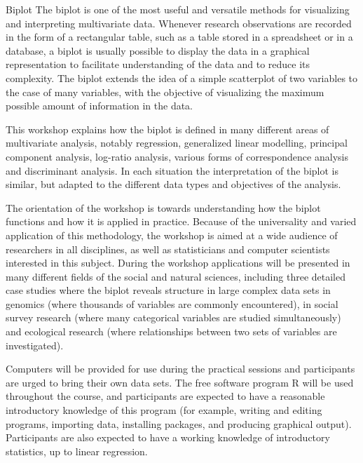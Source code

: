 Biplot
The biplot is one of the most useful and versatile methods for visualizing and interpreting multivariate data. Whenever research observations are recorded in the form of a rectangular table, such as a table stored in a spreadsheet or in a database, a biplot is usually possible to display the data in a graphical representation to facilitate understanding of the data and to reduce its complexity. The biplot extends the idea of a simple scatterplot of two variables to the case of many variables, with the objective of visualizing the maximum possible amount of information in the data.

This workshop explains how the biplot is defined in many different areas of multivariate analysis, notably regression, generalized linear modelling, principal component analysis, log-ratio analysis, various forms of correspondence analysis and discriminant analysis. In each situation the interpretation of the biplot is similar, but adapted to the different data types and objectives of the analysis.

The orientation of the workshop is towards understanding how the biplot functions and how it is applied in practice. Because of the universality and varied application of this methodology, the workshop is aimed at a wide audience of researchers in all disciplines, as well as statisticians and computer scientists interested in this subject. During the workshop applications will be presented in many different fields of the social and natural sciences, including three detailed case studies where the biplot reveals structure in large complex data sets in genomics (where thousands of variables are commonly encountered), in social survey research (where many categorical variables are studied simultaneously) and ecological research (where relationships between two sets of variables are investigated).

Computers will be provided for use during the practical sessions and participants are urged to bring their own data sets. The free software program R will be used throughout the course, and participants are expected to have a reasonable introductory knowledge of this program (for example, writing and editing programs, importing data, installing packages, and producing graphical output).  Participants are also expected to have a working knowledge of introductory statistics, up to linear regression. 
